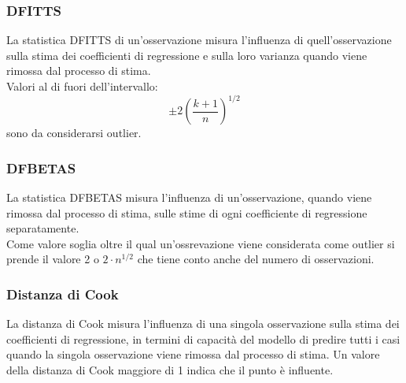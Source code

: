 \subsubsection{DFITTS}
La statistica DFITTS di un'osservazione misura l’influenza di quell'osservazione sulla stima dei coefficienti di regressione e sulla loro varianza quando viene rimossa dal processo di stima.\\
Valori al di fuori dell'intervallo:
\begin{equation}
\pm 2 \left(\frac{k+1}{n}\right)^{1/2} 
\end{equation}
sono da considerarsi outlier.
\subsubsection{DFBETAS}
La statistica DFBETAS misura l’influenza di un'osservazione, quando viene rimossa dal processo di stima, sulle stime di ogni coefficiente di regressione separatamente.\\
Come valore soglia oltre il qual un'ossrevazione viene considerata come outlier si prende il valore 2 o $2 \cdot n^{1/2}$ che tiene conto anche del numero di osservazioni.

\subsubsection{Distanza di Cook}
La distanza di Cook misura l’influenza di una singola osservazione sulla stima dei coefficienti di regressione, in termini di capacità del modello di predire tutti i casi quando la singola osservazione viene rimossa dal processo di stima. Un valore della distanza di Cook maggiore di 1 indica che il punto è influente.


